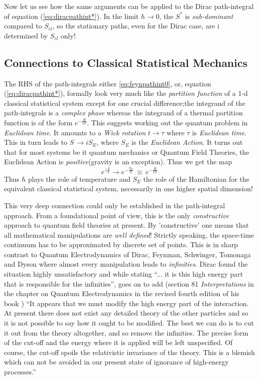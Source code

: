 \documentclass[12pt]{article}
\newcommand{\be}{\begin{equation}}
\newcommand{\ee}{\end{equation}}
\begin{document}
Now let us see how the same arguments can be applied to the Dirac path-integral of equation (\ref{eq:diracpathint*}). In the limit 
$\hbar \rightarrow  0$, the $S^*$ is \emph{sub-dominant} compared to $S_{cl}$, so the stationary paths, even for the Dirac case, are i
determined by $S_{cl}$ only!
\subsection{Connections to Classical Statistical Mechanics}
The RHS of the path-integrals either \ref{eq:feynpathint0}, or, equation (\ref{eq:diracpathint*}), formally look very much like 
the {\it partition function} of a 1-d classical
statistical system except for one crucial difference;the integrand of the path-integrals is a {\it complex phase} whereas the integrand of
a thermal partition function is of the form $e^{- \frac{H}{kT}}$. This suggests working out the quantum problem in {\it Euclidean time}. It
amounts to a {\it Wick rotation} $t \rightarrow  \tau$ where $\tau$ is {\it Euclidean time}. This in turn leads to $S\,\rightarrow i S_E$,
where $S_E$ is the {\it Euclidean Action}.
It turns out that for most systems be it 
quantum mechanics or Quantum Field Theories, the  Euclidean Action is {\it positive}(gravity is an exception). Thus we get the map
\be
\label{eq:euclidean}
e^{\,i \frac{S}{\hbar}} \rightarrow e^{- \frac{S_E}{\hbar}}\,\equiv\,e^{- \frac{H}{kT}}
\ee
Thus $\hbar$ plays the role of temperature and $S_E$ the role of the Hamiltonian for the equivalent classical statistical system, necessarily
in one higher spatial dimension!

This very deep connection could only be established in the path-integral approach. From a foundational point of view, this is the only
{\it constructive} approach to quantum field theories at present. By 'constructive' one means that all mathematical manipulations are
{\it well defined}! Strictly speaking, the space-time continuum has to be approximated by discrete set of points. This is in sharp contrast 
to Quantum Electrodynamics of Dirac, Feynman, Schwinger, Tomonaga and Dyson where almost 
every manipulation leads to {\it infinities}. Dirac found the situation highly unsatisfactory and while stating ``... it is this high 
energy part that is
responsible for the infinities'', goes on to add (section 81 {\it Interpretations} in the chapter on Quantum Electrodynamics in the revised
fourth edition of his book \cite{diracbook4r}) ``It appears that we must modify the high energy part of the interaction. At present there 
does not 
exist any detailed theory of the other particles and so it is not possible to say how it ought to be modified. The best we can do is to cut it
out from the theory altogether, and so remove the infinities. The precise form of the cut-off and the energy where it is applied 
will be left unspecified. Of course, the cut-off spoils the relativistic invariance of the theory. This is a blemish which can not be avoided
in our present state of ignorance of high-energy processes.''
\end{document}
